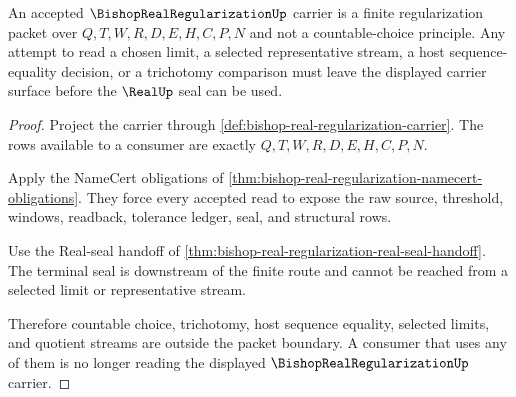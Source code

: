 \begin{theorem}
\label{thm:bishop-real-regularization-no-choice-boundary}
An accepted $\BishopRealRegularizationUp$ carrier is a finite regularization packet over $Q,T,W,R,D,E,H,C,P,N$ and not a countable-choice principle. Any attempt to read a chosen limit, a selected representative stream, a host sequence-equality decision, or a trichotomy comparison must leave the displayed carrier surface before the $\RealUp$ seal can be used.
\end{theorem}
\begin{proof}
Project the carrier through \autoref{def:bishop-real-regularization-carrier}. The rows available to a consumer are exactly $Q,T,W,R,D,E,H,C,P,N$.

Apply the NameCert obligations of \autoref{thm:bishop-real-regularization-namecert-obligations}. They force every accepted read to expose the raw source, threshold, windows, readback, tolerance ledger, seal, and structural rows.

Use the Real-seal handoff of \autoref{thm:bishop-real-regularization-real-seal-handoff}. The terminal seal is downstream of the finite route and cannot be reached from a selected limit or representative stream.

Therefore countable choice, trichotomy, host sequence equality, selected limits, and quotient streams are outside the packet boundary. A consumer that uses any of them is no longer reading the displayed $\BishopRealRegularizationUp$ carrier.
\end{proof}


\begin{closurestatus}{\BishopRealRegularizationUp}
  \theoryclosure{\seedClosure}
  \formalstatus{\unformalizedV}
\end{closurestatus}
